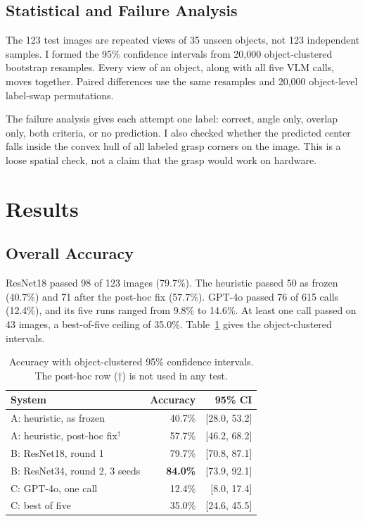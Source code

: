 \documentclass[10pt,conference,compsoc]{IEEEtran}
\begin{document}
\subsection{Statistical and Failure Analysis}

The 123 test images are repeated views of 35 unseen objects, not 123
independent samples. I formed the 95\% confidence intervals from 20,000
object-clustered bootstrap resamples. Every view of an object, along with all
five VLM calls, moves together. Paired differences use the same resamples and
20,000 object-level label-swap permutations.

The failure analysis gives each attempt one label: correct, angle only,
overlap only, both criteria, or no prediction. I also checked whether the
predicted center falls inside the convex hull of all labeled grasp corners on
the image. This is a loose spatial check, not a claim that the grasp would
work on hardware.

\section{Results}

\subsection{Overall Accuracy}

ResNet18 passed 98 of 123 images (79.7\%). The heuristic passed 50 as frozen
(40.7\%) and 71 after the post-hoc fix (57.7\%). GPT-4o passed 76 of 615
calls (12.4\%), and its five runs ranged from 9.8\% to 14.6\%. At least one
call passed on 43 images, a best-of-five ceiling of 35.0\%.
Table~\ref{tab:accuracy} gives the object-clustered intervals.

\begin{table}[t]
\caption{Accuracy with object-clustered 95\% confidence intervals. The
post-hoc row ($\dagger$) is not used in any test.}
\label{tab:accuracy}
\centering
\begin{tabular}{lrr}
\toprule
System & Accuracy & 95\% CI \\
\midrule
A: heuristic, as frozen & 40.7\% & [28.0, 53.2] \\
A: heuristic, post-hoc fix$^\dagger$ & 57.7\% & [46.2, 68.2] \\
B: ResNet18, round 1 & 79.7\% & [70.8, 87.1] \\
B: ResNet34, round 2, 3 seeds & \textbf{84.0\%} & [73.9, 92.1] \\
C: GPT-4o, one call & 12.4\% & [8.0, 17.4] \\
C: best of five & 35.0\% & [24.6, 45.5] \\
\bottomrule
\end{tabular}
\end{table}
\end{document}
